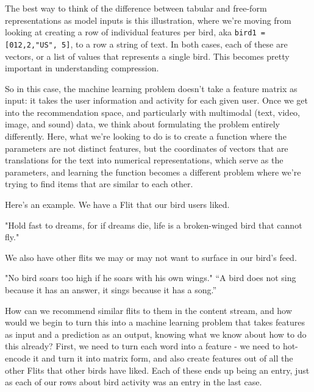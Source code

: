 \documentclass[draft, 11pt]{diazessay} %
\begin{document}
The best way to think of the difference between tabular and free-form representations as model inputs is this illustration, where we're moving from looking at creating a row of individual features per bird, aka \texttt{bird1 = [012,2,"US", 5]}, to a row a string of text. In both cases, each of these are vectors, or a list of values that represents a single bird. This becomes pretty important in understanding compression. 

So in this case, the machine learning problem doesn't take a feature matrix as input: it takes the user information and activity for each given user. Once we get into the recommendation space, and particularly with multimodal (text, video, image, and sound) data, we think about formulating the problem entirely differently. Here, what we're looking to do is to create a function where the parameters are not distinct features, but the coordinates of vectors that are translations for the text into numerical representations, which serve as the parameters, and learning the function\citep{castells2023recommender} becomes a different problem where we're trying to find items that are similar to each other. 

Here’s an example.  We have a Flit that our bird users liked. 

"Hold fast to dreams, for if dreams die, life is a broken-winged bird that cannot fly."

We also have other flits we may or may not want to surface in our bird's feed. 

"No bird soars too high if he soars with his own wings."
“A bird does not sing because it has an answer, it sings because it has a song.” 

How can we recommend similar flits to them in the content stream, and  how would we begin to turn this into a machine learning problem that takes features as input and a prediction as an output, knowing what we know about how to do this already?  First,  we need to turn each word into a feature - we need to hot-encode it and turn it into matrix form, and also create features out of all the other Flits that other birds have liked. Each of these ends up being an entry, just as each of our rows about bird activity was an entry in the last case.  
\end{document}
